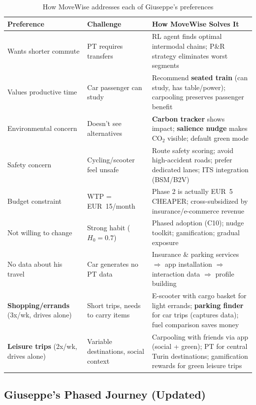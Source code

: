 \documentclass[11pt,a4paper]{article}
\begin{document}
\begin{table}[H]
\centering
\caption{How MoveWise addresses each of Giuseppe's preferences}
\begin{tabular}{@{}p{3.5cm}p{3cm}p{6cm}@{}}
\toprule
\textbf{Preference} & \textbf{Challenge} & \textbf{How MoveWise Solves It} \\
\midrule
Wants shorter commute & PT requires transfers & RL agent finds optimal intermodal chains; P\&R strategy eliminates worst segments \\
\addlinespace
Values productive time & Car passenger can study & Recommend \textbf{seated train} (can study, has table/power); carpooling preserves passenger benefit \\
\addlinespace
Environmental concern & Doesn't see alternatives & \textbf{Carbon tracker} shows impact; \textbf{salience nudge} makes CO$_2$ visible; default green mode \\
\addlinespace
Safety concern & Cycling/scooter feel unsafe & Route safety scoring; avoid high-accident roads; prefer dedicated lanes; ITS integration (BSM/B2V) \\
\addlinespace
Budget constraint & WTP = EUR~15/month & Phase 2 is actually EUR~5 CHEAPER; cross-subsidized by insurance/e-commerce revenue \\
\addlinespace
Not willing to change & Strong habit ($H_0 = 0.7$) & Phased adoption (C10); nudge toolkit; gamification; gradual exposure \\
\addlinespace
No data about his travel & Car generates no PT data & Insurance \& parking services $\Rightarrow$ app installation $\Rightarrow$ interaction data $\Rightarrow$ profile building \\
\addlinespace
\textbf{Shopping/errands} (3x/wk, drives alone) & Short trips, needs to carry items & E-scooter with cargo basket for light errands; \textbf{parking finder} for car trips (captures data); fuel comparison saves money \\
\addlinespace
\textbf{Leisure trips} (2x/wk, drives alone) & Variable destinations, social context & Carpooling with friends via app (social + green); PT for central Turin destinations; gamification rewards for green leisure trips \\
\bottomrule
\end{tabular}
\end{table}

\subsection{Giuseppe's Phased Journey (Updated)}
\end{document}
